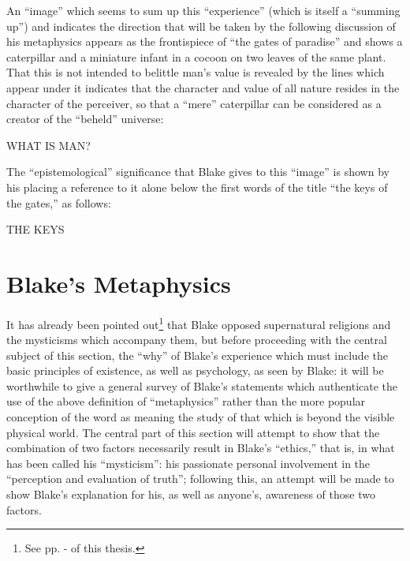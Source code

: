 An \enquote{image} which seems to sum up this \enquote{experience} (which is itself a \enquote{summing up}) and indicates the
direction that will be taken by the following discussion of his metaphysics appears as the frontispiece of
\enquote{the gates of paradise}\supercite{keynes:william-blake}
and shows a caterpillar and a miniature infant in a cocoon on two leaves
of the same plant. That this is not intended to belittle man's value is revealed by the lines which
appear under it indicates that the character and value of all nature resides in the character of the perceiver,
so that a \enquote{mere} caterpillar can be considered as a creator of the \enquote{beheld} universe:

\bigskip

{
	\centering
	WHAT IS MAN?\par
}


The \enquote{epistemological} significance that Blake gives to this \enquote{image} is shown by his placing
a reference to it alone below the first words of the title \enquote{the keys of the gates,} as follows:

\bigskip

{
	\centering
	THE KEYS\par
}


\clearpage

\section{Blake's Metaphysics}

It has already been pointed out\footnote{See pp. \pageref{self:20}-\pageref{self:21} of this thesis.}
that Blake opposed supernatural religions and the mysticisms which accompany them,
but before proceeding with the central subject of this section, the \enquote{why} of Blake's experience which must include the
basic principles of existence, as well as psychology, as seen by Blake: it will be worthwhile to give
a general survey of Blake's statements which authenticate the use of the above definition of \enquote{metaphysics} rather
than the more popular conception of the word as meaning the study of that which is beyond the visible physical world.
The central part of this section will attempt to show that the combination of
%
\label{self:24}%
two factors necessarily result in
Blake's \enquote{ethics,} that is, in what has been called his \enquote{mysticism}: his passionate personal
involvement in the \enquote{perception and evaluation of truth}; following this, an attempt will be made to
show Blake's explanation for his, as well as anyone's, awareness of those two factors.

